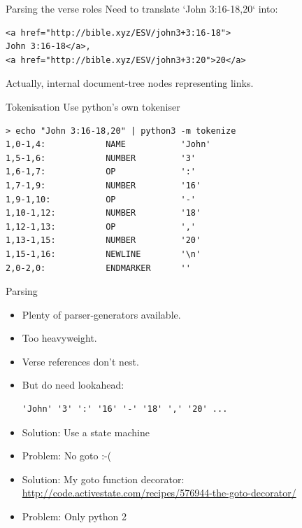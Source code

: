 \documentclass{beamer}
\begin{document}
\begin{frame}[fragile]{Parsing the verse roles}
Need to translate `John 3:16-18,20` into:

\begin{verbatim}
<a href="http://bible.xyz/ESV/john3+3:16-18">
John 3:16-18</a>,
<a href="http://bible.xyz/ESV/john3+3:20">20</a>
\end{verbatim}

Actually, internal document-tree nodes representing links.

\end{frame}

\begin{frame}[fragile]{Tokenisation}
Use python's own tokeniser

\begin{verbatim}
> echo "John 3:16-18,20" | python3 -m tokenize
1,0-1,4:            NAME           'John'         
1,5-1,6:            NUMBER         '3'            
1,6-1,7:            OP             ':'            
1,7-1,9:            NUMBER         '16'           
1,9-1,10:           OP             '-'            
1,10-1,12:          NUMBER         '18'           
1,12-1,13:          OP             ','            
1,13-1,15:          NUMBER         '20'           
1,15-1,16:          NEWLINE        '\n'           
2,0-2,0:            ENDMARKER      ''             
\end{verbatim}

\end{frame}

\begin{frame}[fragile]{Parsing}

\begin{itemize}
\item Plenty of parser-generators available.

\item Too heavyweight.

\item Verse references don't nest.

\item But do need lookahead:
\begin{verbatim}
'John' '3' ':' '16' '-' '18' ',' '20' ...
\end{verbatim}

\item Solution: Use a state machine

\pause
\item Problem: No goto :-(

\pause
\item Solution: My goto function decorator:\\
\url{http://code.activestate.com/recipes/576944-the-goto-decorator/}

\pause
\item Problem: Only python 2
\end{itemize}
\end{frame}
\end{document}
